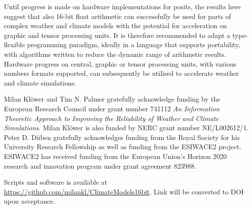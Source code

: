 \documentclass[draft]{agujournal2019}
\begin{document}
Until progress is made on hardware implementations for posits, the results here
suggest that also 16-bit float arithmetic can successfully be used for parts of
complex weather and climate models with the potential for acceleration on graphic
and tensor processing units. It is therefore recommended to adapt a type-flexible
programming paradigm, ideally in a language that supports portability, with
algorithms written to reduce the dynamic range of arithmetic results. Hardware
progress on central, graphic or tensor processing units, with various numbers
formats supported, can subsequently be utilised to accelerate weather and
climate simulations.

\acknowledgments
Milan Kl\"{o}wer and Tim N. Palmer gratefully acknowledge funding by the European
Research Council under grant number 741112 \emph{An Information Theoretic Approach
to Improving the Reliability of Weather and Climate Simulations}. Milan Kl\"{o}wer
is also funded by NERC grant number NE/L002612/1.  Peter D. D\"{u}ben gratefully
acknowledges funding from the Royal Society for his University Research Fellowship
as well as funding from the ESIWACE2 project. ESIWACE2 has received funding from
the European Union's Horizon 2020 research and innovation program under grant
agreement 823988.

Scripts and software is available at
\url{https://github.com/milankl/ClimateModels16bit}. Link will be converted to
DOI upon acceptance.


\end{document}
